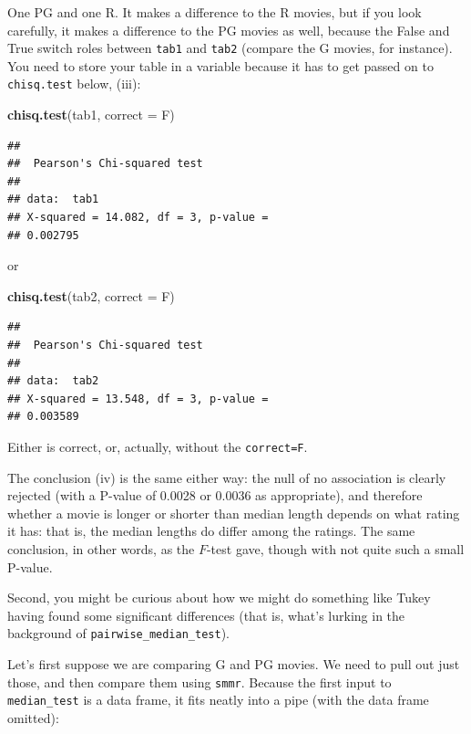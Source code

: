 \documentclass[]{tufte-book}
\newenvironment{Shaded}{}{}
\newcommand{\DataTypeTok}[1]{\textcolor[rgb]{0.56,0.13,0.00}{#1}}
\newcommand{\KeywordTok}[1]{\textcolor[rgb]{0.00,0.44,0.13}{\textbf{#1}}}
\newcommand{\NormalTok}[1]{#1}
\theoremstyle{definition}
\theoremstyle{definition}
\theoremstyle{definition}
\theoremstyle{remark}
\begin{document}
One PG and one R. It makes a difference to the R movies, but if you look
carefully, it makes a difference to the PG movies as well, because the
False and True switch roles between \texttt{tab1} and \texttt{tab2}
(compare the G movies, for instance). You need to store your table in a
variable because it has to get passed on to \texttt{chisq.test} below,
(iii):

\begin{Shaded}
\begin{Highlighting}[]
\KeywordTok{chisq.test}\NormalTok{(tab1, }\DataTypeTok{correct =}\NormalTok{ F)}
\end{Highlighting}
\end{Shaded}

\begin{verbatim}
## 
##  Pearson's Chi-squared test
## 
## data:  tab1
## X-squared = 14.082, df = 3, p-value =
## 0.002795
\end{verbatim}

or

\begin{Shaded}
\begin{Highlighting}[]
\KeywordTok{chisq.test}\NormalTok{(tab2, }\DataTypeTok{correct =}\NormalTok{ F)}
\end{Highlighting}
\end{Shaded}

\begin{verbatim}
## 
##  Pearson's Chi-squared test
## 
## data:  tab2
## X-squared = 13.548, df = 3, p-value =
## 0.003589
\end{verbatim}

Either is correct, or, actually, without the \texttt{correct=F}.

The conclusion (iv) is the same either way: the null of no association
is clearly rejected (with a P-value of 0.0028 or 0.0036 as appropriate),
and therefore whether a movie is longer or shorter than median length
depends on what rating it has: that is, the median lengths do differ
among the ratings. The same conclusion, in other words, as the
\(F\)-test gave, though with not quite such a small P-value.

Second, you might be curious about how we might do something like Tukey
having found some significant differences (that is, what's lurking in
the background of \texttt{pairwise\_median\_test}).

Let's first suppose we are comparing G and PG movies. We need to pull
out just those, and then compare them using \texttt{smmr}. Because the
first input to \texttt{median\_test} is a data frame, it fits neatly
into a pipe (with the data frame omitted):
\end{document}
